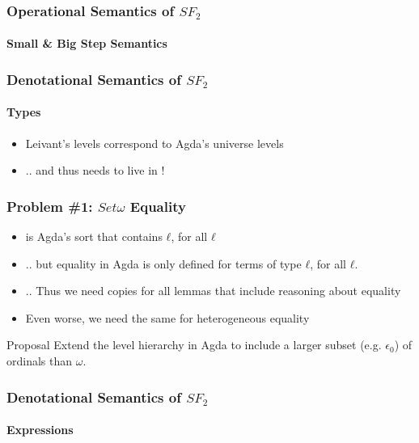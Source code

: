 \documentclass[dvipsnames,aspectratio=169,pdftex]{beamer}
\begin{document}
\begin{frame}
  \frametitle{Operational Semantics of $SF_2$}
  \framesubtitle{Small \& Big Step Semantics}
  \SingleReductionExcerpt
  \SemanticsExcerpt
\end{frame}

\begin{frame}
  \frametitle{Denotational Semantics of $SF_2$}
  \framesubtitle{Types}
  \TFTEnv
  \TFTSem
  \begin{itemize}
    \item Leivant’s levels correspond to Agda’s universe levels
    \item .. and thus  needs to live in !
  \end{itemize}
\end{frame}

\begin{frame}
  \frametitle{Problem \#1: $Set \omega$ Equality}
  \NormalEqDef
  \vspace{-7.5mm} 
  \OmegaEqDef
  \vspace{-7.5mm} 
  \begin{itemize}
    \item {} is Agda’s sort that contains  $ℓ$, for all $ℓ$
    \item .. but equality in Agda is only defined for terms of type  $ℓ$, for all $ℓ$.
    \item .. Thus we need copies for all lemmas that include reasoning about  equality
    \item Even worse, we need the same for heterogeneous equality
  \end{itemize}
  \begin{exampleblock}{Proposal}
    Extend the level hierarchy in Agda to include a larger subset (e.g. $\epsilon_0$) of ordinals than $\omega$.
  \end{exampleblock}
\end{frame}

\begin{frame}
  \frametitle{Denotational Semantics of $SF_2$}
  \framesubtitle{Expressions}
  \TFVEnv
  \TFExprSem
\end{frame}
\end{document}
